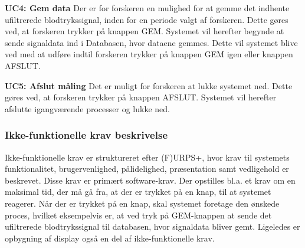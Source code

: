 \textbf{UC4: Gem data}
Der er for forskeren en mulighed for at gemme det indhente ufiltrerede blodtrykssignal, inden for en periode valgt af forskeren. Dette gøres ved, at forskeren trykker på knappen GEM. Systemet vil herefter begynde at sende signaldata ind i Databasen, hvor dataene gemmes. Dette vil systemet blive ved med at udføre indtil forskeren trykker på knappen GEM igen eller knappen AFSLUT.  

\textbf{UC5: Afslut måling}
Det er muligt for forskeren at lukke systemet ned. Dette gøres ved, at forskeren trykker på knappen AFSLUT. Systemet vil herefter afslutte igangværende processer og lukke ned.

\subsubsection{Ikke-funktionelle krav beskrivelse}
Ikke-funktionelle krav er struktureret efter (F)URPS+, hvor krav til systemets funktionalitet, brugervenlighed, pålidelighed, præsentation samt vedligehold er beskrevet. Disse krav er primært software-krav. Der opstilles bl.a. et krav om en maksimal tid, der må gå fra, at der er trykket på en knap, til at systemet reagerer. Når der er trykket på en knap, skal systemet foretage den ønskede proces, hvilket eksempelvis er, at ved tryk på GEM-knappen at sende det ufiltrerede blodtrykssignal til databasen, hvor signaldata bliver gemt. Ligeledes er opbygning af display også en del af ikke-funktionelle krav.